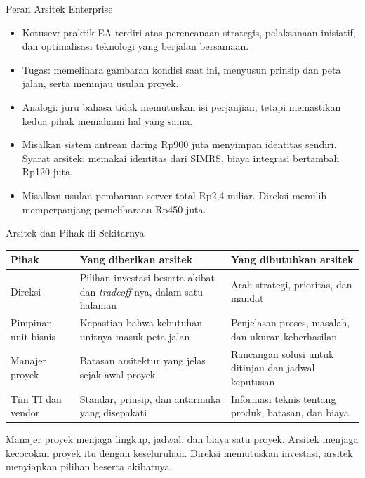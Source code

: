 \documentclass[aspectratio=169, table, 12pt]{beamer}
\begin{document}
\begin{frame}{{\Large Peran Arsitek Enterprise}}
  \small
  \begin{itemize}
    \item Kotusev: praktik EA terdiri atas perencanaan strategis, pelaksanaan inisiatif, dan
          optimalisasi teknologi yang berjalan bersamaan.
    \item Tugas: memelihara gambaran kondisi saat ini, menyusun prinsip dan peta jalan, serta meninjau
          usulan proyek.
    \item Analogi: juru bahasa tidak memutuskan isi perjanjian, tetapi memastikan kedua pihak memahami
          hal yang sama.
    \item Misalkan sistem antrean daring Rp900 juta menyimpan identitas sendiri. Syarat arsitek:
          memakai identitas dari SIMRS, biaya integrasi bertambah Rp120 juta.
    \item Misalkan usulan pembaruan server total Rp2,4 miliar. Direksi memilih memperpanjang
          pemeliharaan Rp450 juta.
  \end{itemize}
\end{frame}

\begin{frame}{{\Large Arsitek dan Pihak di Sekitarnya}}
  \scriptsize
  \begin{tabularx}{\textwidth}{>{\raggedright\arraybackslash}p{2.4cm}
      >{\raggedright\arraybackslash}X >{\raggedright\arraybackslash}X}
    \hline
    \textbf{Pihak} & \textbf{Yang diberikan arsitek} & \textbf{Yang dibutuhkan arsitek} \\
    \hline
    Direksi & Pilihan investasi beserta akibat dan \textit{tradeoff}-nya, dalam satu halaman & Arah strategi, prioritas, dan mandat \\
    \hline
    Pimpinan unit bisnis & Kepastian bahwa kebutuhan unitnya masuk peta jalan & Penjelasan proses, masalah, dan ukuran keberhasilan \\
    \hline
    Manajer proyek & Batasan arsitektur yang jelas sejak awal proyek & Rancangan solusi untuk ditinjau dan jadwal keputusan \\
    \hline
    Tim TI dan vendor & Standar, prinsip, dan antarmuka yang disepakati & Informasi teknis tentang produk, batasan, dan biaya \\
    \hline
  \end{tabularx}

  \vspace{6pt}
  \small Manajer proyek menjaga lingkup, jadwal, dan biaya satu proyek. Arsitek menjaga kecocokan
  proyek itu dengan keseluruhan. Direksi memutuskan investasi, arsitek menyiapkan pilihan beserta
  akibatnya.
\end{frame}
\end{document}
